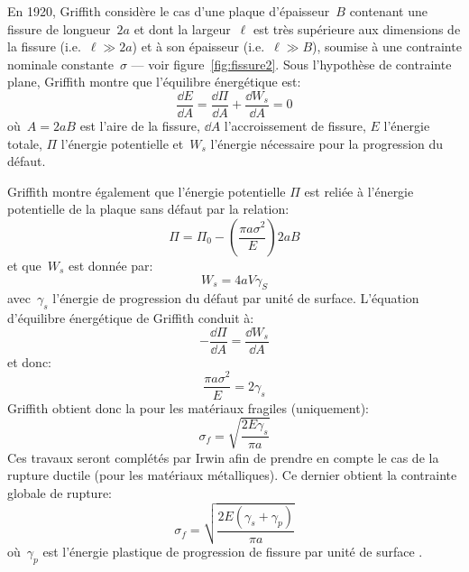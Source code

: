 \medskip
En 1920, Griffith considère le cas d'une plaque
d'épaisseur~$B$ contenant une fissure de longueur~$2a$ et dont la largeur~$\ell$ est très supérieure
aux dimensions de la fissure (i.e.~$\ell\gg 2a$) et à son épaisseur (i.e.~$\ell\gg B$), soumise à une contrainte nominale constante~$\sigma$ --- voir figure~\ref{fig:fissure2}.
\medskipvm
Sous l'hypothèse de contrainte plane, Griffith montre
que l'équilibre énergétique est:
\begin{equation} \frac{\dd E}{\dd A} = \dfrac{\dd\Pi}{\dd A}+\frac{\dd W_s}{\dd A} = 0 \end{equation}
où~$A=2aB$ est l'aire de la fissure, $\dd A$ l'accroissement de fissure, $E$ l'énergie
totale, $\Pi$ l'énergie potentielle et~$W_s$ l'énergie nécessaire pour la progression du
défaut.

\medskip
Griffith montre également que l'énergie potentielle
$\Pi$ est reliée à l'énergie potentielle de la plaque sans défaut par la relation:
\begin{equation} \Pi=\Pi_0 -\left( \dfrac{\pi a \sigma^2}{E} \right) 2aB \end{equation}
et que~$W_s$ est donnée par:
\begin{equation} W_s=4aV\gamma_S\end{equation}
avec~$\gamma_s$ l'énergie de progression du défaut par unité de surface.
L'équation d'équilibre énergétique de Griffith conduit à:
\begin{equation}-\frac{\dd\Pi}{\dd A}=\frac{\dd W_s}{\dd A}\end{equation} et donc:
\begin{equation}\frac{\pi a\sigma^2}{E}=2\gamma_s\end{equation}
\medskipvm
Griffith obtient donc la  pour les matériaux fragiles (uniquement):
\begin{equation} \sigma_f = \sqrt{\dfrac{2E\gamma_s}{\pi a}} \end{equation}
Ces travaux seront complétés par Irwin afin de
prendre en compte le cas de la rupture ductile (pour les matériaux métalliques).
Ce dernier obtient la contrainte globale de rupture:
\begin{equation} \sigma_f = \sqrt{\dfrac{2E(\gamma_s+\gamma_p)}{\pi a}} \end{equation}
où~$\gamma_p$ est l'énergie plastique de progression de fissure par unité de surface
.


